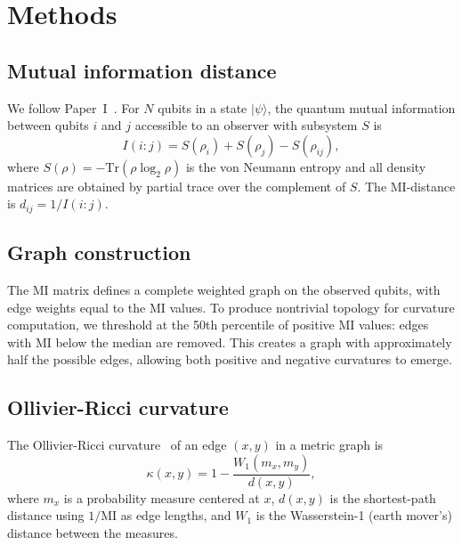 \documentclass[aps,pra,twocolumn,superscriptaddress]{revtex4-2}
\begin{document}
\section{Methods}
\label{sec:methods}

\subsection{Mutual information distance}

We follow Paper~I~\cite{glass2026plc1}. For $N$ qubits in a state $|\psi\rangle$, the quantum mutual information between qubits $i$ and $j$ accessible to an observer with subsystem $S$ is
\begin{equation}
I(i{:}j) = S(\rho_i) + S(\rho_j) - S(\rho_{ij}),
\end{equation}
where $S(\rho) = -\text{Tr}(\rho \log_2 \rho)$ is the von Neumann entropy and all density matrices are obtained by partial trace over the complement of $S$. The MI-distance is $d_{ij} = 1/I(i{:}j)$.


\subsection{Graph construction}

The MI matrix defines a complete weighted graph on the observed qubits, with edge weights equal to the MI values. To produce nontrivial topology for curvature computation, we threshold at the 50th percentile of positive MI values: edges with MI below the median are removed. This creates a graph with approximately half the possible edges, allowing both positive and negative curvatures to emerge.


\subsection{Ollivier-Ricci curvature}

The Ollivier-Ricci curvature~\cite{ollivier2009} of an edge $(x, y)$ in a metric graph is
\begin{equation}
\kappa(x, y) = 1 - \frac{W_1(m_x, m_y)}{d(x, y)},
\label{eq:orc}
\end{equation}
where $m_x$ is a probability measure centered at $x$, $d(x, y)$ is the shortest-path distance using $1/\text{MI}$ as edge lengths, and $W_1$ is the Wasserstein-1 (earth mover's) distance between the measures.
\end{document}
